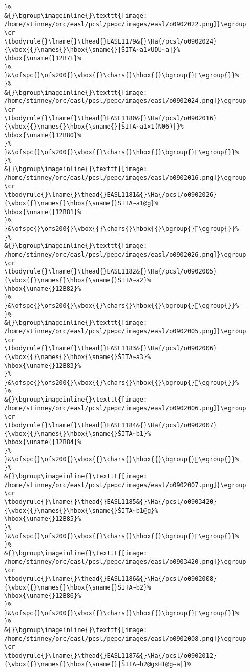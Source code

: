 \begin{verbatim}
}%
&{}\bgroup\imageinline{}\texttt{[image: /home/stinney/orc/easl/pcsl/pepc/images/easl/o0902022.png]}\egroup
\cr
\tbodyrule{}\lname{}\thead{}EASL1179&{}\Ha{/pcsl/o0902024}{\vbox{{}\names{}\hbox{\sname{}|ŠITA∼a1×UDU∼a|}%
\hbox{\uname{}12B7F}%
}%
}&\ofspc{}\ofs200{}\vbox{{}\chars{}\hbox{{}\bgroup{}𒭿\egroup{}}%
}%
&{}\bgroup\imageinline{}\texttt{[image: /home/stinney/orc/easl/pcsl/pepc/images/easl/o0902024.png]}\egroup
\cr
\tbodyrule{}\lname{}\thead{}EASL1180&{}\Ha{/pcsl/o0902016}{\vbox{{}\names{}\hbox{\sname{}|ŠITA∼a1×1(N06)|}%
\hbox{\uname{}12B80}%
}%
}&\ofspc{}\ofs200{}\vbox{{}\chars{}\hbox{{}\bgroup{}𒮀\egroup{}}%
}%
&{}\bgroup\imageinline{}\texttt{[image: /home/stinney/orc/easl/pcsl/pepc/images/easl/o0902016.png]}\egroup
\cr
\tbodyrule{}\lname{}\thead{}EASL1181&{}\Ha{/pcsl/o0902026}{\vbox{{}\names{}\hbox{\sname{}ŠITA∼a1@g}%
\hbox{\uname{}12B81}%
}%
}&\ofspc{}\ofs200{}\vbox{{}\chars{}\hbox{{}\bgroup{}𒮁\egroup{}}%
}%
&{}\bgroup\imageinline{}\texttt{[image: /home/stinney/orc/easl/pcsl/pepc/images/easl/o0902026.png]}\egroup
\cr
\tbodyrule{}\lname{}\thead{}EASL1182&{}\Ha{/pcsl/o0902005}{\vbox{{}\names{}\hbox{\sname{}ŠITA∼a2}%
\hbox{\uname{}12B82}%
}%
}&\ofspc{}\ofs200{}\vbox{{}\chars{}\hbox{{}\bgroup{}𒮂\egroup{}}%
}%
&{}\bgroup\imageinline{}\texttt{[image: /home/stinney/orc/easl/pcsl/pepc/images/easl/o0902005.png]}\egroup
\cr
\tbodyrule{}\lname{}\thead{}EASL1183&{}\Ha{/pcsl/o0902006}{\vbox{{}\names{}\hbox{\sname{}ŠITA∼a3}%
\hbox{\uname{}12B83}%
}%
}&\ofspc{}\ofs200{}\vbox{{}\chars{}\hbox{{}\bgroup{}𒮃\egroup{}}%
}%
&{}\bgroup\imageinline{}\texttt{[image: /home/stinney/orc/easl/pcsl/pepc/images/easl/o0902006.png]}\egroup
\cr
\tbodyrule{}\lname{}\thead{}EASL1184&{}\Ha{/pcsl/o0902007}{\vbox{{}\names{}\hbox{\sname{}ŠITA∼b1}%
\hbox{\uname{}12B84}%
}%
}&\ofspc{}\ofs200{}\vbox{{}\chars{}\hbox{{}\bgroup{}𒮄\egroup{}}%
}%
&{}\bgroup\imageinline{}\texttt{[image: /home/stinney/orc/easl/pcsl/pepc/images/easl/o0902007.png]}\egroup
\cr
\tbodyrule{}\lname{}\thead{}EASL1185&{}\Ha{/pcsl/o0903420}{\vbox{{}\names{}\hbox{\sname{}ŠITA∼b1@g}%
\hbox{\uname{}12B85}%
}%
}&\ofspc{}\ofs200{}\vbox{{}\chars{}\hbox{{}\bgroup{}𒮅\egroup{}}%
}%
&{}\bgroup\imageinline{}\texttt{[image: /home/stinney/orc/easl/pcsl/pepc/images/easl/o0903420.png]}\egroup
\cr
\tbodyrule{}\lname{}\thead{}EASL1186&{}\Ha{/pcsl/o0902008}{\vbox{{}\names{}\hbox{\sname{}ŠITA∼b2}%
\hbox{\uname{}12B86}%
}%
}&\ofspc{}\ofs200{}\vbox{{}\chars{}\hbox{{}\bgroup{}𒮆\egroup{}}%
}%
&{}\bgroup\imageinline{}\texttt{[image: /home/stinney/orc/easl/pcsl/pepc/images/easl/o0902008.png]}\egroup
\cr
\tbodyrule{}\lname{}\thead{}EASL1187&{}\Ha{/pcsl/o0902012}{\vbox{{}\names{}\hbox{\sname{}|ŠITA∼b2@g×HI@g∼a|}%

\end{verbatim}
